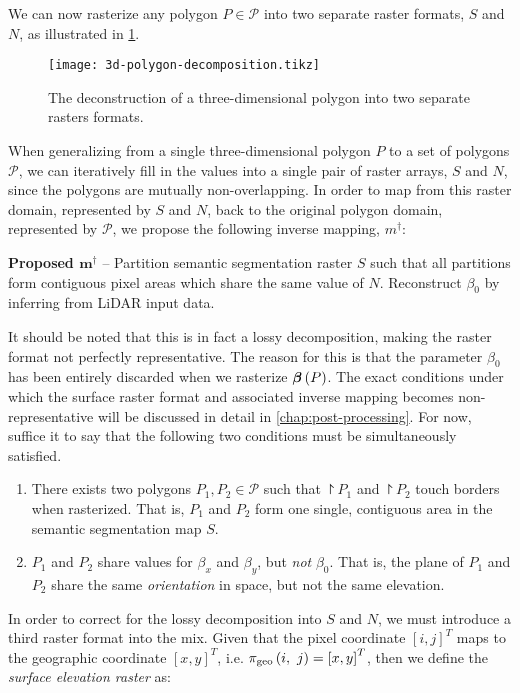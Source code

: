 We can now rasterize any polygon $P \in \mathcal{P}$ into two separate raster formats, $S$ and $N$, as illustrated in \cref{fig:3d-polygon-decomposition}.
\begin{figure}
  \centering
  \texttt{[image: 3d-polygon-decomposition.tikz]}
  \caption{The deconstruction of a three-dimensional polygon into two separate rasters formats.}
  \label{fig:3d-polygon-decomposition}
\end{figure}
When generalizing from a single three-dimensional polygon $P$ to a set of polygons $\mathcal{P}$, we can iteratively fill in the values into a single pair of raster arrays, $S$ and $N$, since the polygons are mutually non-overlapping.
In order to map from this raster domain, represented by $S$ and $N$, back to the original polygon domain, represented by $\mathcal{P}$, we propose the following inverse mapping, $m^{\dagger}$:
\begin{framed}
  \noindent
  \textbf{Proposed $\mathbf{m^{\dagger}}$} -- Partition semantic segmentation raster $S$ such that all partitions form contiguous pixel areas which share the same value of $N$.
  Reconstruct $\beta_0$ by inferring from LiDAR input data.
\end{framed}
\noindent
It should be noted that this is in fact a lossy decomposition, making the raster format not perfectly representative.
The reason for this is that the parameter $\beta_0$ has been entirely discarded when we rasterize $\boldsymbol{\beta}\left(P\right)$.
The exact conditions under which the surface raster format and associated inverse mapping becomes non-representative will be discussed in detail in \cref{chap:post-processing}.
For now, suffice it to say that the following two conditions must be simultaneously satisfied.
\begin{enumerate}
  \item There exists two polygons $P_1, P_2 \in \mathcal{P}$ such that $\project{P_1}$ and $\project{P_2}$ touch borders when rasterized.
    That is, $P_1$ and $P_2$ form one single, contiguous area in the semantic segmentation map $S$.
  \item $P_1$ and $P_2$ share values for $\beta_x$ and $\beta_y$, but \emph{not} $\beta_0$.
    That is, the plane of $P_1$ and $P_2$ share the same \textit{orientation} in space, but not the same elevation.
\end{enumerate}
In order to correct for the lossy decomposition into $S$ and $N$, we must introduce a third raster format into the mix.
Given that the pixel coordinate ${[i, j]}^T$ maps to the geographic coordinate $[x, y]^T$, i.e. $\pi_{\mathrm{geo}}\left(i,~j\right) = {[x, y]}^T$, then we define the \textit{surface elevation raster} as:
